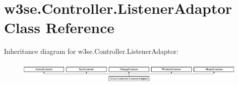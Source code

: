 \hypertarget{classw3se_1_1_controller_1_1_listener_adaptor}{\section{w3se.\-Controller.\-Listener\-Adaptor Class Reference}
\label{classw3se_1_1_controller_1_1_listener_adaptor}
}
Inheritance diagram for w3se.\-Controller.\-Listener\-Adaptor\-:\begin{figure}[H]
\begin{center}
\leavevmode
\includegraphics[height=1.103448cm]{classw3se_1_1_controller_1_1_listener_adaptor}
\end{center}
\end{figure}
